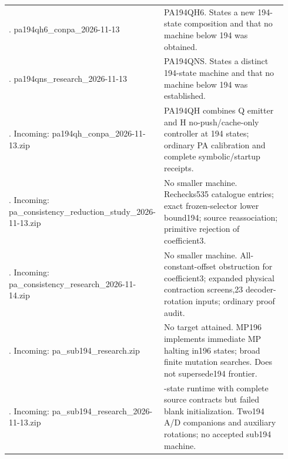 {\begin{longtable}{@{}>{\raggedright\arraybackslash}p{0.34\linewidth}>{\raggedright\arraybackslash}p{0.60\linewidth}@{}}
60. pa194qh6\_\allowbreak{}conpa\_\allowbreak{}2026-11-13 & PA194QH6. States a new 194-state composition and that no machine below 194 was obtained.\\[5pt]
61. pa194qns\_\allowbreak{}research\_\allowbreak{}2026-11-13 & PA194QNS. States a distinct 194-state machine and that no machine below 194 was established.\\[5pt]
62. Incoming: pa194qh\_\allowbreak{}conpa\_\allowbreak{}2026-11-13.zip & PA194QH combines Q emitter and H no-push/cache-only controller at 194 states; ordinary PA calibration and complete symbolic/startup receipts.\\[5pt]
63. Incoming: pa\_\allowbreak{}consistency\_\allowbreak{}reduction\_\allowbreak{}study\_\allowbreak{}2026-11-13.zip & No smaller machine. Rechecks535 catalogue entries; exact frozen-selector lower bound194; source reassociation; primitive rejection of coefficient3.\\[5pt]
64. Incoming: pa\_\allowbreak{}consistency\_\allowbreak{}research\_\allowbreak{}2026-11-14.zip & No smaller machine. All-constant-offset obstruction for coefficient3; expanded physical contraction screens,23 decoder-rotation inputs; ordinary proof audit.\\[5pt]
65. Incoming: pa\_\allowbreak{}sub194\_\allowbreak{}research.zip & No target attained. MP196 implements immediate MP halting in196 states; broad finite mutation searches. Does not supersede194 frontier.\\[5pt]
66. Incoming: pa\_\allowbreak{}sub194\_\allowbreak{}research\_\allowbreak{}2026-11-13.zip & 193-state runtime with complete source contracts but failed blank initialization. Two194 A/D companions and auxiliary rotations; no accepted sub194 machine.\\[5pt]
\end{longtable}
}
